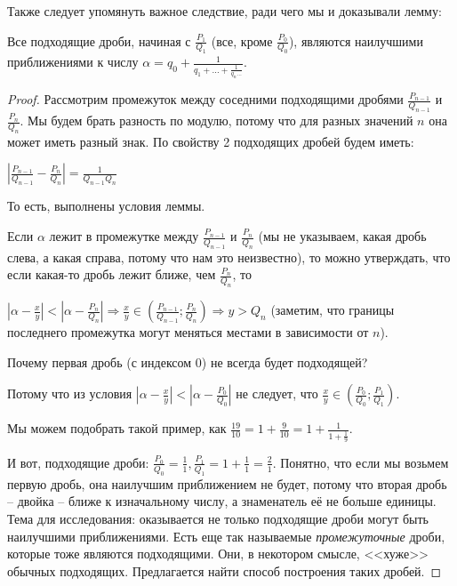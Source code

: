 \documentclass[russian]{lecture-notes}
\begin{document}
	Также следует упомянуть важное следствие, ради чего мы и доказывали лемму: 
	\begin{theorem} 
		Все подходящие дроби, начиная с $\frac{P_1}{Q_1}$ (все, кроме $\frac{P_0}{Q_0}$), являются наилучшими приближениями к числу $\alpha = q_0 + \frac{1}{q_1 + ... + \frac {1}{q_n ...}}$.
	\end{theorem}
	\begin{proof}
		Рассмотрим промежуток между соседними подходящими дробями $\frac{P_{n-1}}{Q_{n-1}}$ и $\frac{P_n}{Q_n}$. Мы будем брать разность по модулю, потому что для разных значений $n$ она может иметь разный знак. По свойству 2 подходящих дробей будем иметь:
		
		$|\frac{P_{n-1}}{Q_{n-1}} - \frac{P_n}{Q_n}| = \frac{1}{Q_{n-1}Q_n}$
		
		То есть, выполнены условия леммы. 
		
		Если $\alpha$ лежит в промежутке между $\frac{P_{n-1}}{Q_{n-1}}$ и $\frac{P_n}{Q_n}$ (мы не указываем, какая дробь слева, а какая справа, потому что нам это неизвестно), то можно утверждать, что если какая-то дробь лежит ближе, чем $\frac{P_n}{Q_n}$, то
		
		$|\alpha - \frac{x}{y}| < |\alpha - \frac{P_n}{Q_n}| \Rightarrow  \frac{x}{y} \in (\frac{P_{n-1}}{Q_{n-1}}; \frac{P_n}{Q_n}) \Rightarrow  y > Q_n$ (заметим, что границы последнего промежутка могут меняться местами в зависимости от $n$).
		
		Почему первая дробь (с индексом 0)  не всегда будет подходящей? 
		
		\centering
		\flushleft
		
		Потому что из условия  $|\alpha - \frac{x}{y}| < |\alpha - \frac{P_0}{Q_0}|$  не следует, что  $\frac{x}{y} \in (\frac{P_0}{Q_0}; \frac{P_1}{Q_1})$.
		
		Мы можем подобрать такой пример, как $\frac{19}{10} = 1 + \frac{9}{10} = 1 + \frac{1}{1+\frac{1}{9}}$. 
		
		И вот, подходящие дроби: $\frac{P_0}{Q_0} = \frac{1}{1}, \frac{P_1}{Q_1} = 1 + \frac{1}{1} = \frac{2}{1}$. Понятно, что если мы возьмем первую дробь, она наилучшим приближением не будет, потому что вторая дробь -- двойка -- ближе к изначальному числу, а знаменатель её не больше единицы. \\
		Тема для исследования: оказывается не только подходящие дроби могут быть наилучшими приближениями. Есть еще так называемые \textit{промежуточные} дроби, которые тоже являются подходящими. Они, в некотором смысле, <<хуже>> обычных подходящих. Предлагается найти способ построения таких дробей.
		
	\end{proof}
		
\end{document}
